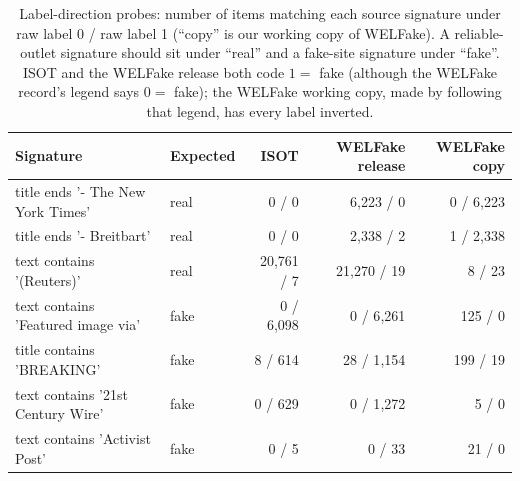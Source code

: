 \begin{table}[h]
\centering
\caption{Label-direction probes: number of items matching each source signature under raw label 0 / raw label 1 (``copy'' is our working copy of WELFake). A reliable-outlet signature should sit under ``real'' and a fake-site signature under ``fake''. ISOT and the WELFake release both code $1=$ fake (although the WELFake record's legend says $0=$ fake); the WELFake working copy, made by following that legend, has every label inverted.}\label{tab:probe}
\footnotesize
\begin{tabular}{@{}llrrr@{}}
\toprule
Signature & Expected & ISOT & WELFake release & WELFake copy \\
\midrule
title ends '- The New York Times' & real & 0 / 0 & 6{,}223 / 0 & 0 / 6{,}223 \\
title ends '- Breitbart' & real & 0 / 0 & 2{,}338 / 2 & 1 / 2{,}338 \\
text contains '(Reuters)' & real & 20{,}761 / 7 & 21{,}270 / 19 & 8 / 23 \\
text contains 'Featured image via' & fake & 0 / 6{,}098 & 0 / 6{,}261 & 125 / 0 \\
title contains 'BREAKING' & fake & 8 / 614 & 28 / 1{,}154 & 199 / 19 \\
text contains '21st Century Wire' & fake & 0 / 629 & 0 / 1{,}272 & 5 / 0 \\
text contains 'Activist Post' & fake & 0 / 5 & 0 / 33 & 21 / 0 \\
\bottomrule
\end{tabular}
\end{table}

